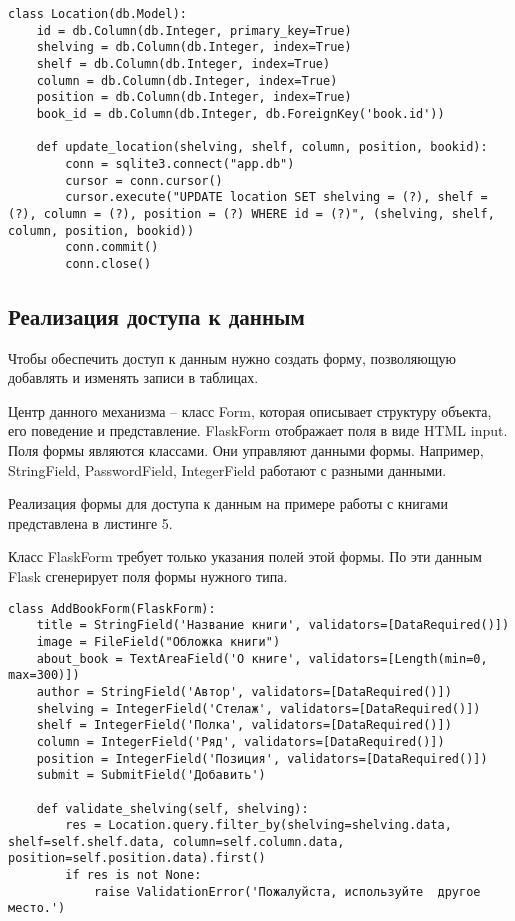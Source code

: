 \begin{lstlisting}[label=some-code, caption=Класс <<Локация>>]
class Location(db.Model):
    id = db.Column(db.Integer, primary_key=True)
    shelving = db.Column(db.Integer, index=True)
    shelf = db.Column(db.Integer, index=True)
    column = db.Column(db.Integer, index=True)
    position = db.Column(db.Integer, index=True)
    book_id = db.Column(db.Integer, db.ForeignKey('book.id'))

    def update_location(shelving, shelf, column, position, bookid):
        conn = sqlite3.connect("app.db")
        cursor = conn.cursor()
        cursor.execute("UPDATE location SET shelving = (?), shelf = (?), column = (?), position = (?) WHERE id = (?)", (shelving, shelf, column, position, bookid))
        conn.commit()
        conn.close()
\end{lstlisting}


\subsection{Реализация доступа к данным}%
\setcounter{subsection}{3}

Чтобы обеспечить доступ к данным нужно создать форму, позволяющую добавлять и изменять записи в таблицах.

Центр данного механизма – класс Form, которая описывает структуру объекта, его поведение и представление. 
FlaskForm отображает поля в виде HTML \<input\>. Поля формы являются классами. Они управляют данными формы. Например, StringField, PasswordField, IntegerField работают с разными данными.

Реализация формы для доступа к данным на примере работы с книгами представлена в листинге 5.

Класс FlaskForm требует только указания полей этой формы. По эти данным Flask сгенерирует поля формы нужного типа.

\begin{lstlisting}[label=some-code, caption=Форма добавления книги]
class AddBookForm(FlaskForm):
    title = StringField('Название книги', validators=[DataRequired()])
    image = FileField("Обложка книги")
    about_book = TextAreaField('О книге', validators=[Length(min=0, max=300)])
    author = StringField('Автор', validators=[DataRequired()])
    shelving = IntegerField('Стелаж', validators=[DataRequired()])
    shelf = IntegerField('Полка', validators=[DataRequired()])
    column = IntegerField('Ряд', validators=[DataRequired()])
    position = IntegerField('Позиция', validators=[DataRequired()])
    submit = SubmitField('Добавить')

    def validate_shelving(self, shelving):
        res = Location.query.filter_by(shelving=shelving.data, shelf=self.shelf.data, column=self.column.data, position=self.position.data).first()
        if res is not None:
            raise ValidationError('Пожалуйста, используйте  другое  место.')
\end{lstlisting}



